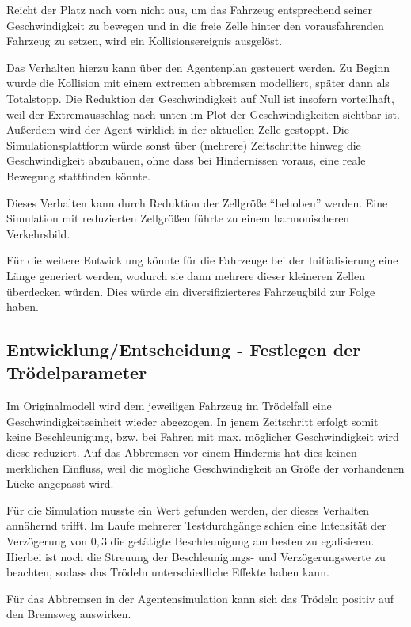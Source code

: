 Reicht der Platz nach vorn nicht aus, um das Fahrzeug entsprechend seiner Geschwindigkeit zu bewegen und in die freie Zelle hinter den vorausfahrenden Fahrzeug zu setzen, wird ein Kollisionsereignis ausgelöst.

Das Verhalten hierzu kann über den Agentenplan gesteuert werden.
Zu Beginn wurde die Kollision mit einem extremen abbremsen modelliert, später dann als Totalstopp.
Die Reduktion der Geschwindigkeit auf Null ist insofern vorteilhaft, weil der Extremausschlag nach unten im Plot der Geschwindigkeiten sichtbar ist.
Außerdem wird der Agent wirklich in der aktuellen Zelle gestoppt. 
Die Simulationsplattform würde sonst über (mehrere) Zeitschritte hinweg die Geschwindigkeit abzubauen, ohne dass bei Hindernissen voraus, eine reale Bewegung stattfinden könnte. 

Dieses Verhalten kann durch Reduktion der Zellgröße \enquote{behoben} werden.
Eine Simulation mit reduzierten Zellgrößen führte zu einem harmonischeren Verkehrsbild.

Für die weitere Entwicklung könnte für die Fahrzeuge bei der Initialisierung eine Länge generiert werden, wodurch sie dann mehrere dieser kleineren Zellen überdecken würden.
Dies würde ein diversifizierteres Fahrzeugbild zur Folge haben.



\subsection{Entwicklung/Entscheidung - Festlegen der Trödelparameter}
\label{sec:lingersweetspot}

Im Originalmodell wird dem jeweiligen Fahrzeug im Trödelfall eine Geschwindigkeitseinheit wieder abgezogen. 
In jenem Zeitschritt erfolgt somit keine Beschleunigung, bzw. bei Fahren mit max. möglicher Geschwindigkeit wird diese reduziert. 
Auf das Abbremsen vor einem Hindernis hat dies keinen merklichen Einfluss, weil die mögliche Geschwindigkeit an Größe der vorhandenen Lücke angepasst wird.

Für die Simulation musste ein Wert gefunden werden, der dieses Verhalten annähernd trifft.
Im Laufe mehrerer Testdurchgänge schien eine Intensität der Verzögerung von $0,3$ die getätigte Beschleunigung am besten zu egalisieren. 
Hierbei ist noch die Streuung der Beschleunigungs- und Verzögerungswerte zu beachten, sodass das Trödeln unterschiedliche Effekte haben kann.

Für das Abbremsen in der Agentensimulation kann sich das Trödeln positiv auf den Bremsweg auswirken.



